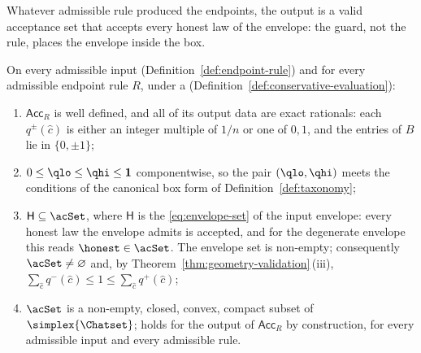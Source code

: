 
Whatever admissible rule produced the endpoints, the output is a valid
acceptance set that accepts every honest law of the envelope: the guard, not
the rule, places the envelope inside the box.

\begin{theorem}\label{thm:box-construction}
On every admissible input (Definition~\ref{def:endpoint-rule}) and for every
admissible endpoint rule $R$, under a 
(Definition~\ref{def:conservative-evaluation}):
\begin{enumerate}[label=(\roman*),leftmargin=2.2em]
\item $\mathsf{Acc}_R$ is well defined, and all of its output data are exact
rationals: each $q^{\pm}(\hat c)$ is either an integer multiple of $1/n$ or one
of $0,1$, and the entries of $B$ lie in $\{0,\pm1\}$;
\item $0\le\qlo\le\qhi\le\mathbf{1}$ componentwise, so the pair
$(\qlo,\qhi)$ meets the conditions of the canonical box form of
Definition~\ref{def:taxonomy};
\item $\mathsf{H}\subseteq\acSet$, where $\mathsf{H}$ is the
 \eqref{eq:envelope-set} of the input envelope: every
honest law the envelope admits is accepted, and for the degenerate envelope
this reads $\honest\in\acSet$. The envelope set is non-empty; consequently
$\acSet\neq\varnothing$ and, by Theorem~\ref{thm:geometry-validation}\,(iii),
$\sum_{\hat c}q^{-}(\hat c)\le1\le\sum_{\hat c}q^{+}(\hat c)$;
\item $\acSet$ is a non-empty, closed, convex, compact subset of
$\simplex{\Chatset}$;  holds for the output of
$\mathsf{Acc}_R$ by construction, for every admissible input and every
admissible rule.
\end{enumerate}
\end{theorem}

